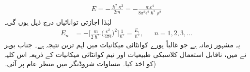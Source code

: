  \begin{align}
E=-\frac{\hslash^{2}\kappa ^{2}}{2m}=-\frac{me^{4}}{8\pi^{2}\epsilon^{2}\hslash^{2}\rho^{2}} 
\end{align}
 لہٰذا اجازتی توانائیاں درج ذیل ہوں گی۔ 
 \begin{align}\label{مساوات_ابعادی_ہائیڈروجن_اجازتی_توانائیاں}
E_{n}&=-\big[\frac{m}{2\hslash^{2}}\big(\frac{e^{2}}{4\pi\epsilon}\big)^{2}\big]\frac{1}{n^{2}}=\frac{E_{1}}{n^{2}}, && n=1,2,3,\dotsc
\end{align}
 یہ مشہور زمانہ  ہے جو غالباً پورے کوانٹائی میکانیات میں اہم ترین نتیجہ ہے۔ جناب بوہر نے  میں، ناقابل استعمال کلاسیکی طبیعیات اور نیم کوانٹائی میکانیات کے ذریعہ اس کلیہ کو اخذ کیا۔ مساوات شروڈنگر  میں منظر عام پر آئی۔)

